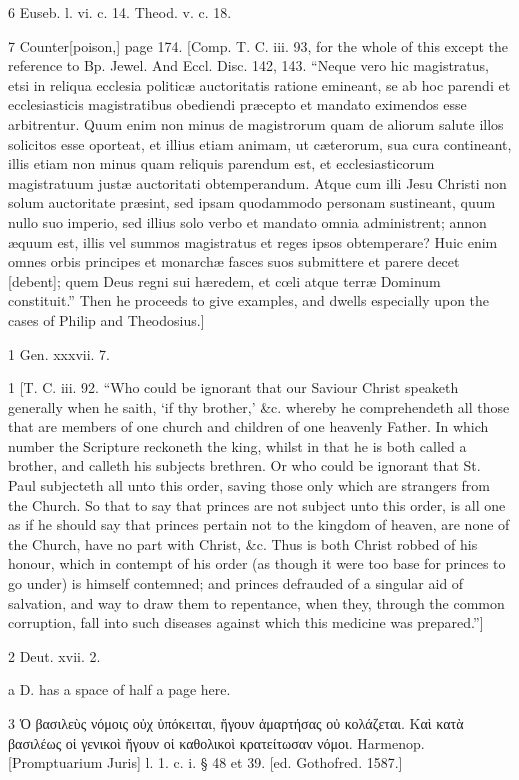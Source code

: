6
Euseb. l. vi. c. 14. Theod. v. c. 18.

7
Counter[poison,] page 174. [Comp. T. C. iii. 93, for the whole of this except the reference to Bp. Jewel. And Eccl. Disc. 142, 143. “Neque vero hic magistratus, etsi in reliqua ecclesia politicæ auctoritatis ratione emineant, se ab hoc parendi et ecclesiasticis magistratibus obediendi præcepto et mandato eximendos esse arbitrentur. Quum enim non minus de magistrorum quam de aliorum salute illos solicitos esse oporteat, et illius etiam animam, ut cæterorum, sua cura contineant, illis etiam non minus quam reliquis parendum est, et ecclesiasticorum magistratuum justæ auctoritati obtemperandum. Atque cum illi Jesu Christi non solum auctoritate præsint, sed ipsam quodammodo personam sustineant, quum nullo suo imperio, sed illius solo verbo et mandato omnia administrent; annon æquum est, illis vel summos magistratus et reges ipsos obtemperare? Huic enim omnes orbis principes et monarchæ fasces suos submittere et parere decet [debent]; quem Deus regni sui hæredem, et cœli atque terræ Dominum constituit.” Then he proceeds to give examples, and dwells especially upon the cases of Philip and Theodosius.]

1
Gen. xxxvii. 7.

1
[T. C. iii. 92. “Who could be ignorant that our Saviour Christ speaketh generally when he saith, ‘if thy brother,’ &c. whereby he comprehendeth all those that are members of one church and children of one heavenly Father. In which number the Scripture reckoneth the king, whilst in that he is both called a brother, and calleth his subjects brethren. Or who could be ignorant that St. Paul subjecteth all unto this order, saving those only which are strangers from the Church. So that to say that princes are not subject unto this order, is all one as if he should say that princes pertain not to the kingdom of heaven, are none of the Church, have no part with Christ, &c. Thus is both Christ robbed of his honour, which in contempt of his order (as though it were too base for princes to go under) is himself contemned; and princes defrauded of a singular aid of salvation, and way to draw them to repentance, when they, through the common corruption, fall into such diseases against which this medicine was prepared.”]

2
Deut. xvii. 2.

a
D. has a space of half a page here.

3
Ὁ βασιλεὺς νόμοις οὐχ ὑπόκειται, ἤγουν ἁμαρτήσας οὐ κολάζεται. Καὶ κατὰ βασιλέως οἱ γενικοὶ ἤγουν οἱ καθολικοὶ κρατείτωσαν νόμοι. Harmenop. [Promptuarium Juris] l. 1. c. i. § 48 et 39. [ed. Gothofred. 1587.]

